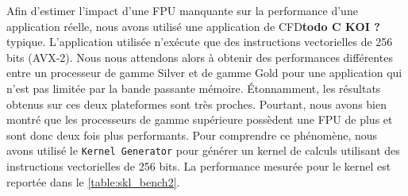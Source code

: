         \begin{table}[h!]
        \centering
        
        \caption{Pour différents processeurs, le nombre d'instructions FMA AVX-512 pouvant être exécutée chaque cycle a été mesuré à l'aide du \texttt{Kernel Generator}. En fonction du nombre de FPU présent sur un coeur (1 ou 2), le nombre d'instructions exécutées varie (1 ou 2). La performance \gls{flopsmax} du benchmark HPL mesurée GFLOPS varie de la même façon suivant la gamme du processeur utilisé. Afin de pouvoir comparer les différentes gammes de processeurs, la configuration suivante a été appliquée à chaque processeur: désactivation de l'\textit{hyperthreading}, fréquence limitée à 1.5 GHz, utilisation de 8 coeurs. \textbf{todo: revoir les valeurs}}
        \label{table:skl_bench}
        \end{table}
        
        
        Afin d'estimer l'impact d'une FPU manquante sur la performance d'une application réelle, nous avons utilisé une application de CFD\textbf{todo C KOI ?} typique. L'application utilisée n'exécute que des instructions vectorielles de 256 bits (AVX-2). Nous nous attendons alors à obtenir des performances différentes entre un processeur de gamme Silver et de gamme Gold pour une application qui n'est pas limitée par la bande passante mémoire. Étonnamment, les résultats obtenus sur ces deux plateformes sont très proches. Pourtant, nous avons bien montré que les processeurs de gamme supérieure possèdent une FPU de plus et sont donc deux fois plus performants. Pour comprendre ce phénomène, nous avons utilisé le \verb|Kernel Generator| pour générer un kernel de calculs utilisant des instructions vectorielles de 256 bits. La performance mesurée pour le kernel est reportée dans le \autoref{table:skl_bench2}.  
        
